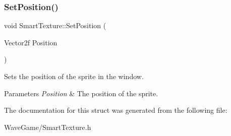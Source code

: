 \subsubsection{\texorpdfstring{Set\+Position()}{SetPosition()}}
{\footnotesize\ttfamily void Smart\+Texture\+::\+Set\+Position (\begin{DoxyParamCaption}\item[{Vector2f}]{Position }\end{DoxyParamCaption})\hspace{0.3cm}{\ttfamily [inline]}}



Sets the position of the sprite in the window. 


\begin{DoxyParams}{Parameters}
{\em Position} & The position of the sprite.\\
\hline
\end{DoxyParams}


The documentation for this struct was generated from the following file\+:\begin{DoxyCompactItemize}
\item 
Wave\+Game/Smart\+Texture.\+h\end{DoxyCompactItemize}

